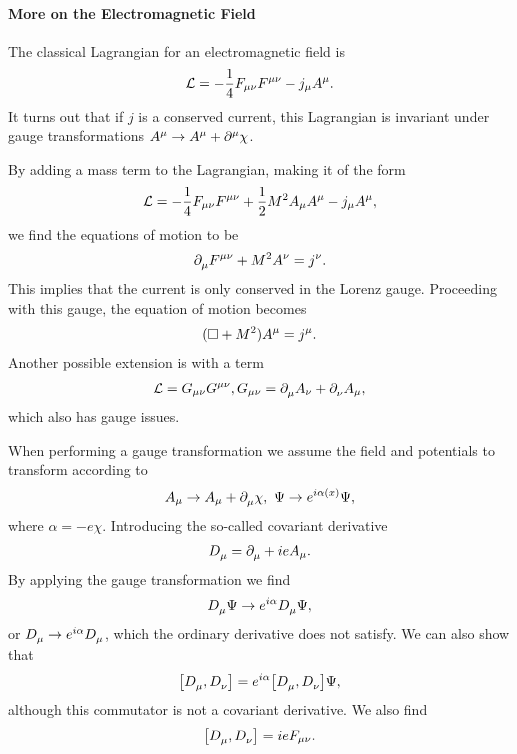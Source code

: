 \paragraph{More on the Electromagnetic Field}
The classical Lagrangian for an electromagnetic field is
\begin{align*}
	\mathcal{L} = -\frac{1}{4}F_{\mu\nu}F^{\mu\nu} - j_{\mu}A^{\mu}.
\end{align*}
It turns out that if $j$ is a conserved current, this Lagrangian is invariant under gauge transformations $A^{\mu} \to A^{\mu} + \partial^{\mu}_{}{\chi}$.

By adding a mass term to the Lagrangian, making it of the form
\begin{align*}
	\mathcal{L} = -\frac{1}{4}F_{\mu\nu}F^{\mu\nu} + \frac{1}{2}M^{2}A_{\mu}A^{\mu} - j_{\mu}A^{\mu},
\end{align*}
we find the equations of motion to be
\begin{align*}
	\partial^{}_{\mu}{F^{\mu\nu}} + M^{2}A^{\nu} = j^{\nu}.
\end{align*}
This implies that the current is only conserved in the Lorenz gauge. Proceeding with this gauge, the equation of motion becomes
\begin{align*}
	(\square  + M^{2})A^{\mu} = j^{\mu}.
\end{align*}
Another possible extension is with a term
\begin{align*}
	\mathcal{L} = G_{\mu\nu}G^{\mu\nu}, G_{\mu\nu} = \partial^{}_{\mu}{A_{\nu}} + \partial^{}_{\nu}{A_{\mu}},
\end{align*}
which also has gauge issues.

When performing a gauge transformation we assume the field and potentials to transform according to
\begin{align*}
	A_{\mu} \to A_{\mu} + \partial^{}_{\mu}{\chi},\ \Psi \to e^{i\alpha(x)}\Psi,
\end{align*}
where $\alpha = -e\chi$. Introducing the so-called covariant derivative
\begin{align*}
	D^{}_{\mu} = \partial^{}_{\mu}{} + ieA_{\mu}.
\end{align*}
By applying the gauge transformation we find
\begin{align*}
	D^{}_{\mu}\Psi \to e^{i\alpha}D^{}_{\mu}\Psi,
\end{align*}
or $D^{}_{\mu}\to e^{i\alpha}D^{}_{\mu}$, which the ordinary derivative does not satisfy. We can also show that
\begin{align*}
	\comm{\cdel{}{\mu}}{\cdel{}{\nu}} = e^{i\alpha}\comm{\cdel{}{\mu}}{\cdel{}{\nu}}\Psi,
\end{align*}
although this commutator is not a covariant derivative. We also find
\begin{align*}
	\comm{\cdel{}{\mu}}{\cdel{}{\nu}} = ieF_{\mu\nu}.
\end{align*}

